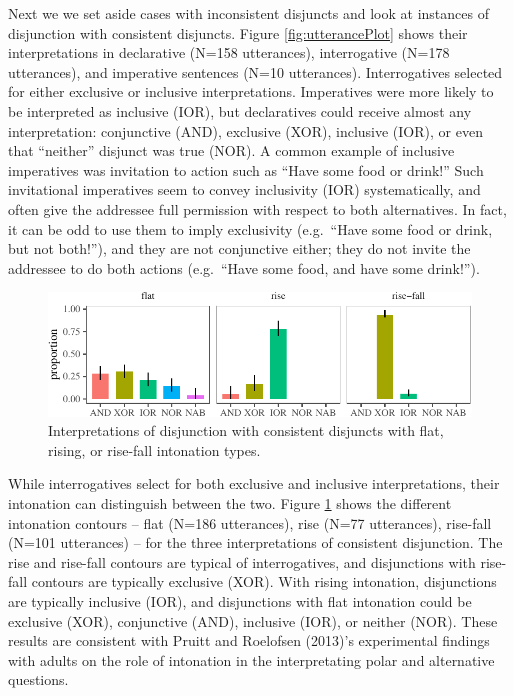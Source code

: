 \documentclass[
  english,
  ,man,floatsintext]{apa6}
\begin{document}
Next we we set aside cases with inconsistent disjuncts and look at instances of disjunction with consistent disjuncts. Figure \ref{fig:utterancePlot} shows their interpretations in declarative (N=158 utterances), interrogative (N=178 utterances), and imperative sentences (N=10 utterances). Interrogatives selected for either exclusive or inclusive interpretations. Imperatives were more likely to be interpreted as inclusive (IOR), but declaratives could receive almost any interpretation: conjunctive (AND), exclusive (XOR), inclusive (IOR), or even that ``neither'' disjunct was true (NOR). A common example of inclusive imperatives was invitation to action such as ``Have some food or drink!'' Such invitational imperatives seem to convey inclusivity (IOR) systematically, and often give the addressee full permission with respect to both alternatives. In fact, it can be odd to use them to imply exclusivity (e.g.~``Have some food or drink, but not both!''), and they are not conjunctive either; they do not invite the addressee to do both actions (e.g.~``Have some food, and have some drink!'').

\begin{figure}[tb]

{\centering \includegraphics{figs/intonationPlot-1} 

}

\caption{Interpretations of disjunction with consistent disjuncts with flat, rising, or rise-fall intonation types.}\label{fig:intonationPlot}
\end{figure}

While interrogatives select for both exclusive and inclusive interpretations, their intonation can distinguish between the two. Figure \ref{fig:intonationPlot} shows the different intonation contours -- flat (N=186 utterances), rise (N=77 utterances), rise-fall (N=101 utterances) -- for the three interpretations of consistent disjunction. The rise and rise-fall contours are typical of interrogatives, and disjunctions with rise-fall contours are typically exclusive (XOR). With rising intonation, disjunctions are typically inclusive (IOR), and disjunctions with flat intonation could be exclusive (XOR), conjunctive (AND), inclusive (IOR), or neither (NOR). These results are consistent with Pruitt and Roelofsen (2013)'s experimental findings with adults on the role of intonation in the interpretating polar and alternative questions.
\end{document}
